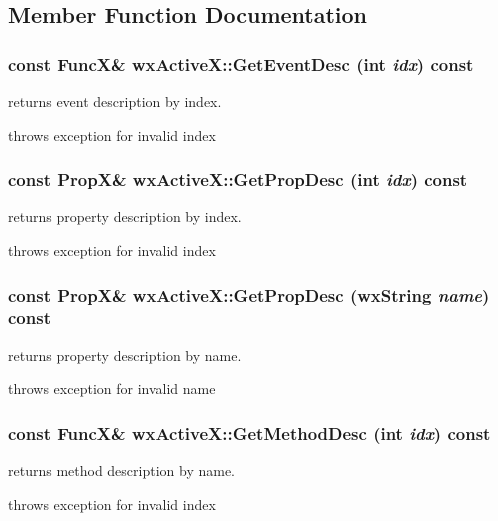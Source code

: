 \subsection{Member Function Documentation}
\subsubsection{\setlength{\rightskip}{0pt plus 5cm}const {\bf Func\-X}\& wx\-Active\-X::Get\-Event\-Desc (int {\em idx}) const}\label{classwxActiveX_a4}


returns event description by index.

throws exception for invalid index 
\subsubsection{\setlength{\rightskip}{0pt plus 5cm}const {\bf Prop\-X}\& wx\-Active\-X::Get\-Prop\-Desc (int {\em idx}) const}\label{classwxActiveX_a6}


returns property description by index.

throws exception for invalid index 
\subsubsection{\setlength{\rightskip}{0pt plus 5cm}const {\bf Prop\-X}\& wx\-Active\-X::Get\-Prop\-Desc (wx\-String {\em name}) const}\label{classwxActiveX_a7}


returns property description by name.

throws exception for invalid name 
\subsubsection{\setlength{\rightskip}{0pt plus 5cm}const {\bf Func\-X}\& wx\-Active\-X::Get\-Method\-Desc (int {\em idx}) const}\label{classwxActiveX_a9}


returns method description by name.

throws exception for invalid index 
